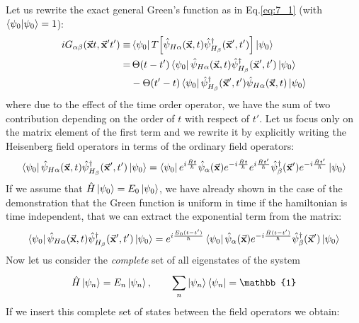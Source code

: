 \documentclass[../main/main.tex]{subfiles}
\begin{document}
Let us rewrite the exact general Green's function as in Eq.\eqref{eq:7_1} (with \( \braket{\psi _0}{\psi _0} =1  \)):
\begin{equation*}
\begin{split}
i G_{\alpha \beta }(\va{x}t, \va{x}'t') \equiv & \bra{\psi _0} T \qty[ \hat{\psi }_{H \alpha } (\va{x},t) \hat{\psi }_{H_ \beta }^\dag (\va{x}',t')  ] \ket{\psi _0}  \\
= &\, \Theta (t-t') \bra{\psi _0}  \hat{\psi }_{H \alpha } (\va{x},t) \hat{\psi }_{H_ \beta }^\dag (\va{x}',t')  \ket{\psi _0} \\
& - \Theta (t'-t) \bra{\psi _0}  \hat{\psi }_{H_ \beta }^\dag (\va{x}',t')  \hat{\psi }_{H \alpha } (\va{x},t) \ket{\psi _0}
\end{split}
\label{eq:9_2}
\end{equation*}
where due to the effect of the time order operator, we have the sum of two contribution depending on the order of \( t \) with respect of \( t' \).
Let us focus only on the matrix element of the first term and we rewrite it by explicitly writing the Heisenberg field operators in terms of the ordinary field operators:
\begin{equation*}
  \bra{\psi _0}  \hat{\psi }_{H \alpha } (\va{x},t) \hat{\psi }_{H_ \beta }^\dag (\va{x}',t')  \ket{\psi _0}
  = \bra{\psi _0 }  e^{i \frac{\hat{H}t }{\hbar }} \hat{\psi }_ \alpha  (\va{x})
  e^{-i \frac{\hat{H}t }{\hbar }} e^{i \frac{\hat{H}t' }{\hbar }} \hat{\psi }_ \beta ^\dag (\va{x}') e^{-i \frac{\hat{H}t' }{\hbar }} \ket{\psi _0}
\end{equation*}
If we assume that \( \hat{H} \ket{\psi _0} = E_0 \ket{\psi _0}    \), we have already shown in the case of the demonstration that the Green function is uniform in time if the hamiltonian is time independent, that we can extract the exponential term from the matrix:
\begin{equation*}
    \bra{\psi _0}  \hat{\psi }_{H \alpha } (\va{x},t) \hat{\psi }_{H_ \beta }^\dag (\va{x}',t')  \ket{\psi _0}
    = e^{i \frac{E_0 (t-t')}{\hbar} }
    \bra{\psi _0 }  \hat{\psi }_ \alpha  (\va{x})
    e^{-i \frac{\hat{H} (t-t') }{\hbar }} \hat{\psi }_ \beta ^\dag (\va{x}')\ket{\psi _0}
\end{equation*}
Now let us consider the \emph{complete} set of all eigenstates of the system
\begin{equation*}
  \hat{H} \ket{\psi _n} = E_n \ket{\psi _n}, \qquad \sum_{n}^{} \ket{\psi _n} \bra{\psi _n} = \mathbb{1}
\end{equation*}
If we insert this complete set of states between the field operators we obtain:
\end{document}
